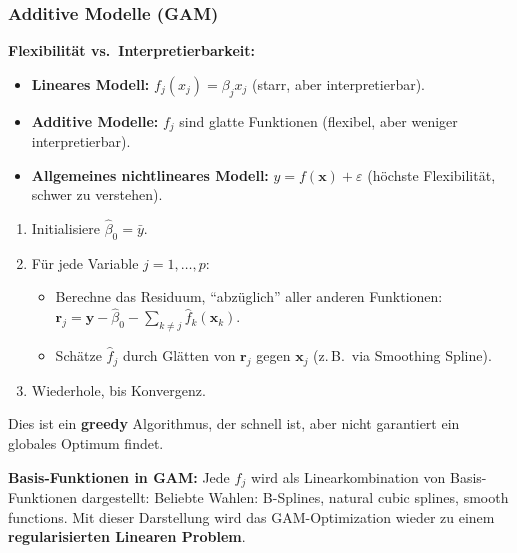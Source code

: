 \subsubsection{Additive Modelle (GAM)}


\textbf{Flexibilität vs.\ Interpretierbarkeit:}
\begin{itemize}[leftmargin=1.5em]
    \item \textbf{Lineares Modell:} $f_j(x_j) = \beta_j x_j$ (starr, aber interpretierbar).
    \item \textbf{Additive Modelle:} $f_j$ sind glatte Funktionen (flexibel, aber weniger interpretierbar).
    \item \textbf{Allgemeines nichtlineares Modell:} $y = f(\mathbf{x}) + \varepsilon$ (höchste Flexibilität, schwer zu verstehen).
\end{itemize}

\begin{enumerate}[leftmargin=2em]
    \item Initialisiere $\hat{\beta}_0 = \bar{y}$.
    \item Für jede Variable $j = 1, \ldots, p$:
          \begin{itemize}
              \item Berechne das Residuum, ``abzüglich'' aller anderen Funktionen: $\mathbf{r}_j = \mathbf{y} - \hat{\beta}_0 - \sum_{k \neq j} \hat{f}_k(\mathbf{x}_k)$.
              \item Schätze $\hat{f}_j$ durch Glätten von $\mathbf{r}_j$ gegen $\mathbf{x}_j$ (z.\,B.\ via Smoothing Spline).
          \end{itemize}
    \item Wiederhole, bis Konvergenz.
\end{enumerate}
Dies ist ein \textbf{greedy} Algorithmus, der schnell ist, aber nicht garantiert ein globales Optimum findet.

\textbf{Basis-Funktionen in GAM:} Jede $f_j$ wird als Linearkombination von Basis-Funktionen dargestellt:
Beliebte Wahlen: B-Splines, natural cubic splines, smooth functions. Mit dieser Darstellung wird das GAM-Optimization wieder zu einem \textbf{regularisierten Linearen Problem}.

